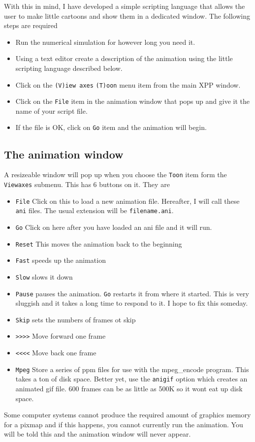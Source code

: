 \documentclass{article}
\begin{document}
With this in mind, I have developed a simple scripting language that
allows the user to make little cartoons and show them in a dedicated
window.  The following steps are required
\begin{itemize}
\item Run the numerical simulation for however long you need it.
\item  Using a text editor create a description of the animation using
the little scripting language described below.
\item Click on the {\tt (V)iew axes} {\tt (T)oon} menu item from the
main XPP window.
\item Click on the {\tt File} item in the animation window that pops
up and give it the name of your script file.
\item If the file is OK, click on {\tt Go} item and the animation will
begin.
\end{itemize}

\subsection{The animation window}
A resizeable window will pop up when you choose the {\tt Toon} item
form the {\tt Viewaxes} submenu. This has 6 buttons on it. They are
\begin{itemize}
\item {\tt File} Click on this to load a new animation
file. Hereafter, I will call these {\tt ani} files. The usual
extension will be {\tt filename.ani}.  
\item {\tt Go} Click on here after you have loaded an ani file and it
will run.
\item {\tt Reset} This moves the animation back to the beginning
\item {\tt Fast} speeds up the animation
\item {\tt Slow} slows it down
\item {\tt Pause} pauses the animation. {\tt Go} restarts it from
where it started. This is very sluggish and it takes a long time to
respond to it. I hope to fix this someday.
\item{\tt Skip} sets the numbers of frames ot skip
\item{\tt >>>>} Move forward one frame
\item{\tt <<<<} Move back one frame
\item{\tt Mpeg} Store a series of ppm files for use with the
mpeg\_encode program. This takes a ton of disk space.  Better yet, use
the {\tt anigif} option which creates an animated gif file.  600
frames can be as little as 500K so it wont eat up disk space.
\end{itemize}
Some computer systems cannot produce the required amount of graphics
memory for a pixmap and if this happens, you cannot currently run the
animation. You will be told this and the animation window will never
appear. 
\end{document}
